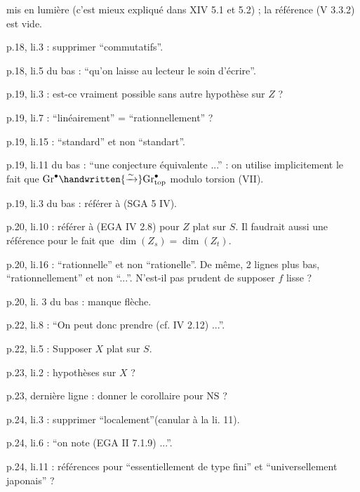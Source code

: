  mis en lumière (c'est mieux expliqué dans XIV 5.1 et 5.2) ; la référence (V 3.3.2) est vide.

p.18, li.3 : supprimer ``commutatifs''.

p.18, li.5 du bas : ``qu'on laisse au lecteur le soin d'écrire''.

p.19, li.3 : est-ce vraiment possible sans autre hypothèse sur $Z$ ?

p.19, li.7 : ``linéairement'' = ``rationnellement'' ?

p.19, li.15 : ``standard'' et non ``standart''.

p.19, li.11 du bas : ``une conjecture équivalente ...'' : on utilise implicitement le fait que $\mathrm{Gr}^{\bullet}\handwritten{\xrightarrow{\sim}}\mathrm{Gr}^{\bullet}_{\mathrm{top}}$ modulo torsion (VII\hspace{2em}).

p.19, li.3 du bas : référer à (SGA 5 IV\hspace{2em}).

p.20, li.10 : référer à (EGA IV 2.8) pour $Z$ plat sur $S$. Il faudrait aussi une référence pour le fait que $\dim(Z_s) = \dim(Z_t)$.

p.20, li.16 : ``rationnelle'' et non ``rationelle''. De même, 2 lignes plus bas, ``rationnellement'' et non ``...''. N'est-il pas prudent de supposer $f$ lisse ?

p.20, li. 3 du bas : manque flèche.

p.22, li.8 : ``On peut donc prendre (cf. IV 2.12) ...''.

p.22, li.5 : Supposer $X$ plat sur $S$.

p.23, li.2 : hypothèses sur $X$ ?

p.23, dernière ligne : donner le corollaire pour $\mathrm{NS}$ ?

\noindent{}p.24, li.3 : supprimer ``localement''(canular à la li. 11).

p.24, li.6 : ``on note (EGA II 7.1.9) ...''.

p.24, li.11 : références pour ``essentiellement de type fini'' et\hspace{0.6em} ``universellement japonais'' ?

